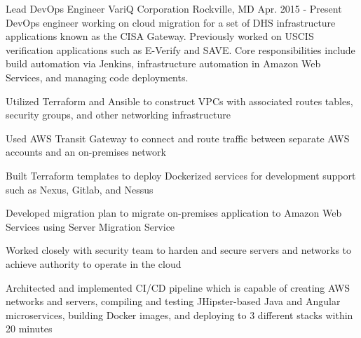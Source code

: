 

\begin{cventries}

  \cventrysix
    {Lead DevOps Engineer} %
    {VariQ Corporation} %
    {Rockville, MD} %
    {Apr. 2015 - Present} %
    {DevOps engineer working on cloud migration for a set of DHS infrastructure applications known as the CISA Gateway. Previously worked on USCIS verification applications such as E-Verify and SAVE. Core responsibilities include build automation via Jenkins, infrastructure automation in Amazon Web Services, and managing code deployments.} %
    {
      \begin{cvitems} %
        \item {Utilized Terraform and Ansible to construct VPCs with associated routes tables, security groups, and other networking infrastructure}
        \item {Used AWS Transit Gateway to connect and route traffic between separate AWS accounts and an on-premises network}
        \item {Built Terraform templates to deploy Dockerized services for development support such as Nexus, Gitlab, and Nessus}
        \item {Developed migration plan to migrate on-premises application to Amazon Web Services using Server Migration Service}
        \item {Worked closely with security team to harden and secure servers and networks to achieve authority to operate in the cloud}
        \item {Architected and implemented CI/CD pipeline which is capable of creating AWS networks and servers, compiling and testing JHipster-based Java and Angular microservices, building Docker images, and deploying to 3 different stacks within 20 minutes}

\end{cvitems}}
\end{cventries}
